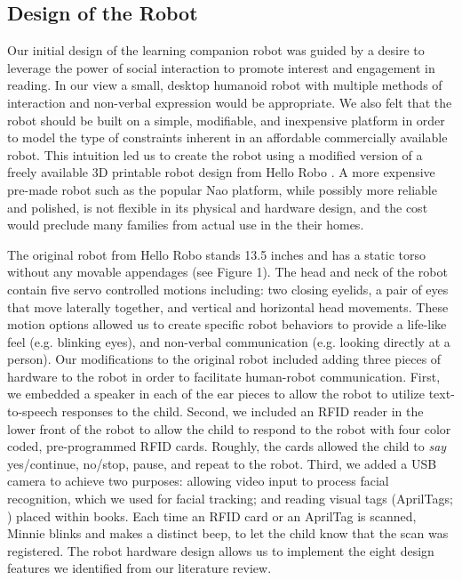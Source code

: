 \documentclass{sigchi}
\begin{document}
\subsection{Design of the Robot}
Our initial design of the learning companion robot was guided by a desire to leverage the power of social interaction to promote interest and engagement in reading. In our view a small, desktop humanoid robot with multiple methods of interaction and non-verbal expression would be appropriate. We also felt that the robot should be built on a simple, modifiable, and inexpensive platform in order to model the type of constraints inherent in an affordable commercially available robot. This intuition led us to create the robot using a modified version of a freely available 3D printable robot design from Hello Robo \cite{Robo:2016}. A more expensive pre-made robot such as the popular Nao platform, while possibly more reliable and polished, is not flexible in its physical and hardware design, and the cost would preclude many families from actual use in the their homes.

The original robot from Hello Robo stands 13.5 inches and has a static torso without any movable appendages (see Figure 1). The head and neck of the robot contain five servo controlled motions including: two closing eyelids, a pair of eyes that move laterally together, and vertical and horizontal head movements. These motion options allowed us to create specific robot behaviors to provide a life-like feel (e.g. blinking eyes), and non-verbal communication (e.g. looking directly at a person). Our modifications to the original robot included adding three pieces of hardware to the robot in order to facilitate human-robot communication. First, we embedded a speaker in each of the ear pieces to allow the robot to utilize text-to-speech responses to the child. Second, we included an RFID reader in the lower front of the robot to allow the child to respond to the robot with four color coded, pre-programmed RFID cards. Roughly, the cards allowed the child to \textit{say} yes/continue, no/stop, pause, and repeat to the robot. Third, we added a USB camera to achieve two purposes: allowing video input to process facial recognition, which we used for facial tracking; and reading visual tags (AprilTags; \cite{}) placed within books. Each time an RFID card or an AprilTag is scanned, Minnie blinks and makes a distinct beep, to let the child know that the scan was registered. The robot hardware design allows us to implement the eight design features we identified from our literature review.
\end{document}
